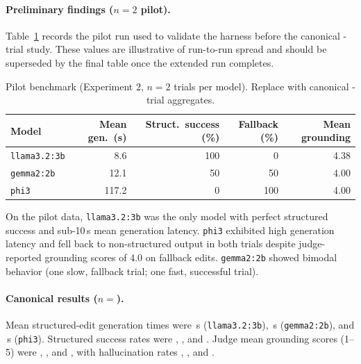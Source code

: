 \paragraph{Preliminary findings ($n{=}2$ pilot).}
Table~\ref{tab:benchmark-pilot} records the pilot run used to validate the harness before the canonical \BenchTrialN{}-trial study. These values are illustrative of run-to-run spread and should be superseded by the final table once the extended run completes.

\begin{table}[t]
  \centering
  \caption{Pilot benchmark (Experiment 2, $n{=}2$ trials per model). Replace with canonical \BenchTrialN{}-trial aggregates.}
  \label{tab:benchmark-pilot}
  \begin{tabular}{lrrrr}
    \hline
    Model & Mean gen.\ (s) & Struct.\ success (\%) & Fallback (\%) & Mean grounding \\
    \hline
    \texttt{llama3.2:3b} & 8.6  & 100 & 0   & 4.38 \\
    \texttt{gemma2:2b}   & 12.1 & 50  & 50  & 4.00 \\
    \texttt{phi3}        & 117.2 & 0  & 100 & 4.00 \\
    \hline
  \end{tabular}
\end{table}

On the pilot data, \texttt{llama3.2:3b} was the only model with perfect structured success and sub-10\,s mean generation latency. \texttt{phi3} exhibited high generation latency and fell back to non-structured output in both trials despite judge-reported grounding scores of 4.0 on fallback edits. \texttt{gemma2:2b} showed bimodal behavior (one slow, fallback trial; one fast, successful trial).

\paragraph{Canonical results ($n{=}$\BenchTrialN{}).}
Mean structured-edit generation times were \BenchLlamaGen\,s (\texttt{llama3.2:3b}), \BenchGemmaGen\,s (\texttt{gemma2:2b}), and \BenchPhiGen\,s (\texttt{phi3}). Structured success rates were \BenchLlamaSucc, \BenchGemmaSucc, and \BenchPhiSucc. Judge mean grounding scores (1--5) were \BenchLlamaGround, \BenchGemmaGround, and \BenchPhiGround, with hallucination rates \BenchLlamaHall, \BenchGemmaHall, and \BenchPhiHall.

